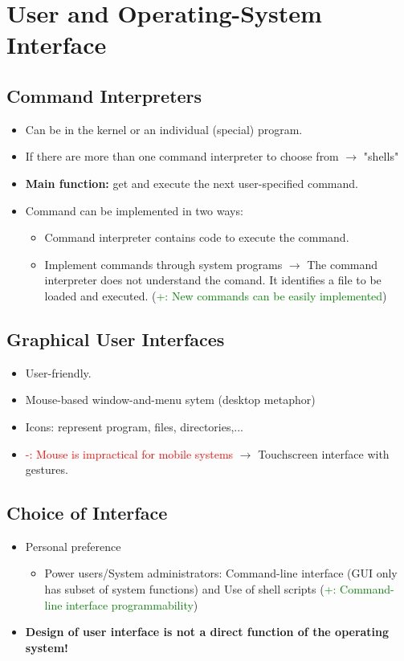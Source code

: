 \documentclass[10pt]{report}
\begin{document}
		\section{User and Operating-System Interface}
			\subsection{Command Interpreters}
  			\begin{itemize}
  				\item Can be in the kernel or an individual (special) program.
  				\item If there are more than one command interpreter to choose from $\rightarrow$ "shells"
  				\item \textbf{Main function:} get and execute the next user-specified command.
  				\item Command can be implemented in two ways:
  				\begin{itemize}
  					\item Command interpreter contains code to execute the command.
  					\item Implement commands through system programs $\rightarrow$ The command interpreter does not understand the comand. It identifies a file to be loaded and executed. (\textcolor{green}{+: New commands can be easily implemented})
  				\end{itemize}
  			\end{itemize}

			\subsection{Graphical User Interfaces}
  			\begin{itemize}
  				\item User-friendly.
  				\item Mouse-based window-and-menu sytem (desktop metaphor)
  				\item Icons: represent program, files, directories,...
  				\item \textcolor{red}{-: Mouse is impractical for mobile systems} $\rightarrow$ Touchscreen interface with gestures.
  			\end{itemize}
			\subsection{Choice of Interface}
  			\begin{itemize}
  				\item Personal preference
  				\begin{itemize}
  					\item Power users/System administrators: Command-line interface (GUI only has subset of system functions) and Use of shell scripts (\textcolor{green}{+: Command-line interface programmability})
  				\end{itemize}
  				\item \textbf{Design of user interface is not a direct function of the operating system!}
  			\end{itemize}
\end{document}
